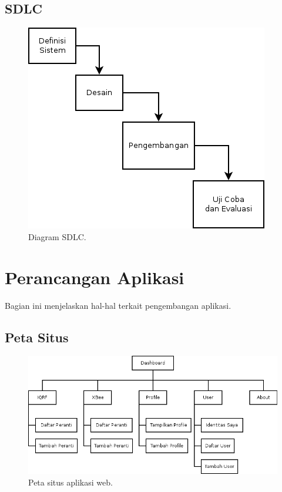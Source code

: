 		\subsection{SDLC}
			\begin{figure}[ht!]
			  \centering
			    \includegraphics{gambar/sdlc}
			    \caption{Diagram SDLC.}
			    \label{sdlc}
			\end{figure}
	
	\section{Perancangan Aplikasi}
		Bagian ini menjelaskan hal-hal terkait pengembangan aplikasi.

		\subsection{Peta Situs}
			\begin{figure}[ht!]
			  \centering
			    \includegraphics{gambar/sitemap}
			    \caption{Peta situs aplikasi web.}
			    \label{sitemap}
			\end{figure}			

